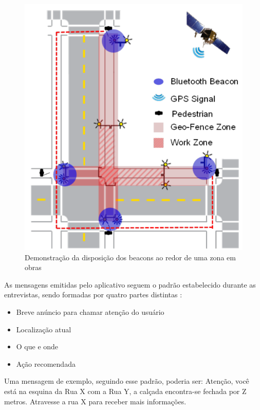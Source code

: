 \documentclass[english,brazilian]{UNISINOSmonografia}
\begin{document}
\begin{figure}[!ht]
	\caption{Demonstração da disposição dos beacons ao redor de uma zona em obras}
	\label{fig:workZoneScheme}
	\centering%
	\begin{minipage}{.4\textwidth}
		\includegraphics[width=\textwidth]{imgs/workzoneSchema}
		\end{minipage}
\end{figure}


As mensagens emitidas pelo aplicativo seguem o padrão estabelecido durante as entrevistas, sendo formadas por quatro partes distintas \cite{chen2014}:
\begin{itemize}
	\item Breve anúncio para chamar atenção do usuário
	\item Localização atual
	\item O que e onde
	\item Ação recomendada
\end{itemize}

Uma mensagem de exemplo, seguindo esse padrão, poderia ser: Atenção, você está na esquina da Rua X com a Rua Y, a calçada encontra-se fechada por Z metros. Atravesse a rua X para receber mais informações.
\end{document}
